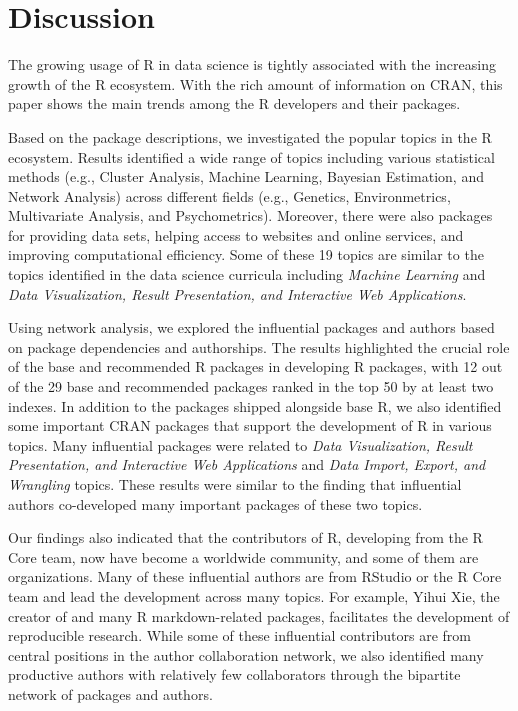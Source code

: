 \section{Discussion}

The growing usage of R in data science is tightly associated with the increasing growth of the R ecosystem. With the rich amount of information on CRAN, this paper shows the main trends among the R developers and their packages.

Based on the package descriptions, we investigated the popular topics in the R ecosystem. Results identified a wide range of topics including various statistical methods (e.g., Cluster Analysis, Machine Learning, Bayesian Estimation, and Network Analysis) across different fields (e.g., Genetics, Environmetrics, Multivariate Analysis, and Psychometrics). Moreover, there were also packages for providing data sets, helping access to websites and online services, and improving computational efficiency. Some of these 19 topics are similar to the topics identified in the data science curricula \citep{zhang2021data} including {\it Machine Learning} and {\it Data Visualization, Result Presentation, and Interactive Web Applications}.

Using network analysis, we explored the influential packages and authors based on package dependencies and authorships. The results highlighted the crucial role of the base and recommended R packages in developing R packages, with 12 out of the 29 base and recommended packages ranked in the top 50 by at least two indexes. In addition to the packages shipped alongside base R, we also identified some important CRAN packages that support the development of R in various topics.  Many influential packages were related to {\it Data Visualization, Result Presentation, and Interactive Web Applications} and {\it Data Import, Export, and Wrangling} topics. These results were similar to the finding that influential authors co-developed many important packages of these two topics. 

Our findings also indicated that the contributors of R, developing from the R Core team, now have become a worldwide community, and some of them are organizations. Many of these influential authors are from RStudio or the R Core team and lead the development across many topics. For example, Yihui Xie, the creator of  and many R markdown-related packages, facilitates the development of reproducible research. While some of these influential contributors are from central positions in the author collaboration network, we also identified many productive authors with relatively few collaborators through the bipartite network of packages and authors.

